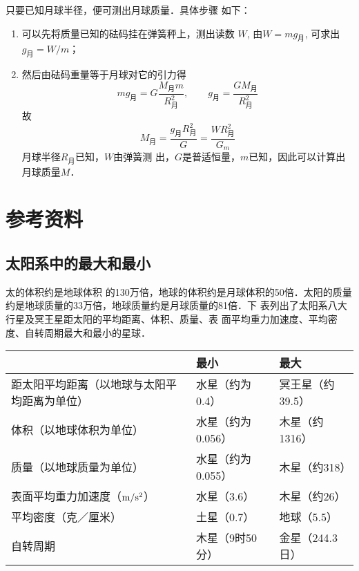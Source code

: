 \begin{enumerate}
	\begin{solution}
只要已知月球半径，便可测出月球质量．具体步骤
如下：
\begin{enumerate}
\item 可以先将质量已知的砝码挂在弹簧秤上，测出读数
$W$, 由$W=mg_{\text{月}}$, 可求出$g_{\text{月}}=W/m$；
\item 然后由砝码重量等于月球对它的引力得
\[mg_{\text{月}}=G\frac{M_{\text{月}}m}{R^2_{\text{月}}},\qquad g_{\text{月}}=\frac{GM_{\text{月}}}{R^2_{\text{月}}}\]
故
\[M_{\text{月}}=\frac{g_{\text{月}}R^2_{\text{月}}}{G}=\frac{WR^2_{\text{月}}}{G_m}\]
月球半径$R_{\text{月}}$已知，$W$由弹簧测
出，$G$是普适恒量，$m$已知，因此可以计算出月球质量$M$．
\end{enumerate}


	\end{solution}
	

\end{enumerate}
	
	
\section{参考资料}
\subsection{太阳系中的最大和最小}

太的体积约是地球体积
的130万倍，地球的体积约是月球体积的50倍．太阳的质量
约是地球质量的33万倍，地球质量约是月球质量的81倍．下
表列出了太阳系八大行星及冥王星距太阳的平均距离、体积、质量、表
面平均重力加速度、平均密度、自转周期最大和最小的星球．

\begin{center}
\begin{tabular}{p{}p{}p{}}
\hline
&  最小  &最大\\
\hline
距太阳平均距离（以地球与太阳平均距离为单位） & 水星（约为0.4）&冥王星（约39.5）\\
体积（以地球体积为单位） & 水星（约为0.056）&木星（约1316）\\
质量（以地球质量为单位） & 水星（约为0.055）&木星（约318）\\
表面平均重力加速度（$\text{m}/\text{s}^2$）&  水星（3.6）&木星（约26）\\
平均密度（克／厘米）& 土星（0.7）&地球（5.5）\\
自转周期&木星（9时50分）& 金星（244.3日）\\
\hline
\end{tabular}
\end{center}

